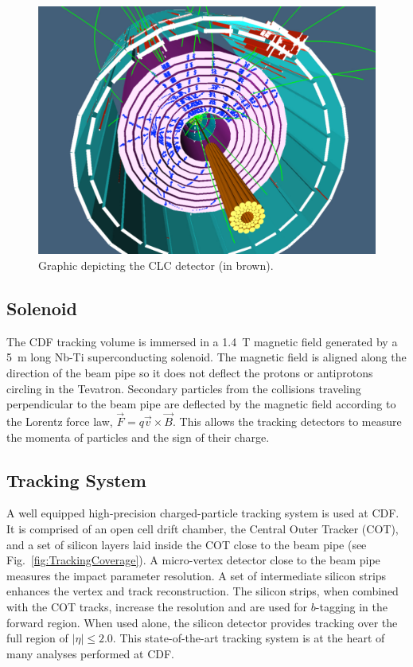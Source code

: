 \begin{figure}[htb!]
\begin{centering}
\includegraphics[scale=0.3]{CLC_withTracks.pdf}
\caption{Graphic depicting the CLC detector (in brown).}
\label{fig_CLC_Assembly}
\end{centering}
\end{figure}


\subsection{Solenoid}
The CDF tracking volume is immersed in a 1.4~T magnetic field generated by a 5~m long Nb-Ti superconducting solenoid. The magnetic field is aligned along the direction of the beam pipe so it does not deflect the protons or antiprotons circling in the Tevatron. Secondary particles from the collisions traveling perpendicular to the beam pipe are deflected by the magnetic field according to the Lorentz force law, $\vec{F}=q\vec{v}\times \vec{B}$. This allows the tracking detectors to measure the momenta of particles and the sign of their charge.

\subsection{Tracking System}\label{sec:TrackingSystem}
A well equipped high-precision charged-particle tracking system is used at CDF. It is comprised of an open cell drift chamber, the Central Outer Tracker (COT), and a set of silicon layers laid inside the COT close to the beam pipe (see Fig.~\ref{fig:TrackingCoverage}). A micro-vertex detector close to the beam pipe measures the impact parameter resolution. A set of intermediate silicon strips enhances the vertex and track reconstruction. The silicon strips, when combined with the COT tracks, increase the \pt resolution and are used for $b$-tagging in the forward region. When used alone, the silicon detector provides tracking over the full region of \mbox{$|\eta|\leq2.0$}. This state-of-the-art tracking system is at the heart of many analyses performed at CDF.

